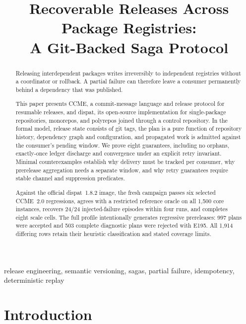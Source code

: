 \documentclass[10pt,conference]{IEEEtran}
\theoremstyle{definition}
\begin{document}
\title{Recoverable Releases Across Package Registries:\\
       A Git-Backed Saga Protocol}

\maketitle

\begin{abstract}
Releasing interdependent packages writes irreversibly to independent
registries without a coordinator or rollback. A partial failure can therefore
leave a consumer permanently behind a dependency that was published.

This paper presents CCME, a commit-message language and release protocol for
resumable releases, and dispat, its open-source implementation for single-package
repositories, monorepos, and polyrepos joined through a control repository.
In the formal model, release state consists of git tags, the
plan is a pure function of repository history, dependency graph and
configuration, and propagated work is admitted against the consumer's pending
window. We prove eight guarantees, including no orphans, exactly-once ledger
discharge and convergence under an explicit retry invariant. Minimal counterexamples establish why delivery must be tracked per consumer,
why prerelease aggregation needs a separate window, and why retry guarantees
require stable channel and suppression predicates.

Against the official dispat~1.8.2 image, the fresh campaign passes six selected
CCME~2.0 regressions, agrees with a restricted reference oracle on all 1{,}500 core
instances, recovers 24/24 injected-failure episodes within four runs, and
completes eight scale cells. The full profile intentionally generates
regressive prereleases: 997 plans were accepted and 503 complete diagnostic
plans were rejected with E195. All 1{,}914 differing rows retain their
heuristic classification and stated coverage limits.
\end{abstract}

\begin{IEEEkeywords}
release engineering, semantic versioning, sagas, partial failure,
idempotency, deterministic replay
\end{IEEEkeywords}

\section{Introduction}
\label{sec:intro}
\end{document}
